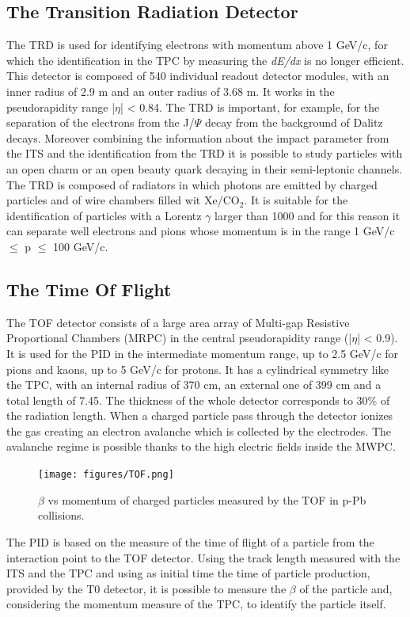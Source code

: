 \subsection*{The Transition Radiation Detector}
The TRD is used for identifying electrons with momentum above 1 GeV/c, for which the identification in the TPC by measuring the \textit{dE/dx} is no longer efficient. This detector is composed of 540 individual readout detector modules, with an inner radius of 2.9 m and an outer radius of 3.68 m. It works in the pseudorapidity range |$\eta$| < 0.84. The TRD is important, for example, for the separation of the electrons from the J/$\Psi$ decay from the background of Dalitz decays. Moreover combining the information about the impact parameter from the ITS and the identification from the TRD it is possible to study particles with an open charm or an open beauty quark decaying in their semi-leptonic channels. The TRD is composed of radiators in which photons are emitted by charged particles and of wire chambers filled wit Xe/CO$_2$. It is suitable for the identification of particles with a Lorentz $\gamma$ larger than 1000 and for this reason it can separate well electrons and pions whose momentum is in the range 1 GeV/c $\leq$ p $\leq$ 100 GeV/c.
\subsection*{The Time Of Flight}
The TOF detector consists of a large area array of Multi-gap Resistive Proportional Chambers (MRPC) in the central pseudorapidity range (|$\eta$| < 0.9). It is used for the PID in the intermediate momentum range, up to 2.5 GeV/c for pions and kaons, up to 5 GeV/c for protons. It has a cylindrical symmetry like the TPC, with an internal radius of 370 cm, an external one of 399 cm and a total length of 7.45. The thickness of the whole detector corresponds to 30\% of the radiation length. When a charged particle pass through the detector ionizes the gas creating an electron avalanche which is collected by the electrodes. The avalanche regime is possible thanks to the high electric fields inside the MWPC.\\
%
\begin{figure}
  \centering
  \texttt{[image: figures/TOF.png]}
  \caption{$\beta$ vs momentum of charged particles measured by the TOF in p-Pb collisions.}
  \label{fig:TOF}
\end{figure}
%
The PID is based on the measure of the time of flight of a particle from the interaction point to the TOF detector. Using the track length measured with the ITS and the TPC and using as initial time the time of particle production, provided by the T0 detector, it is possible to measure the $\beta$ of the particle and, considering the momentum measure of the TPC, to identify the particle itself.\\
